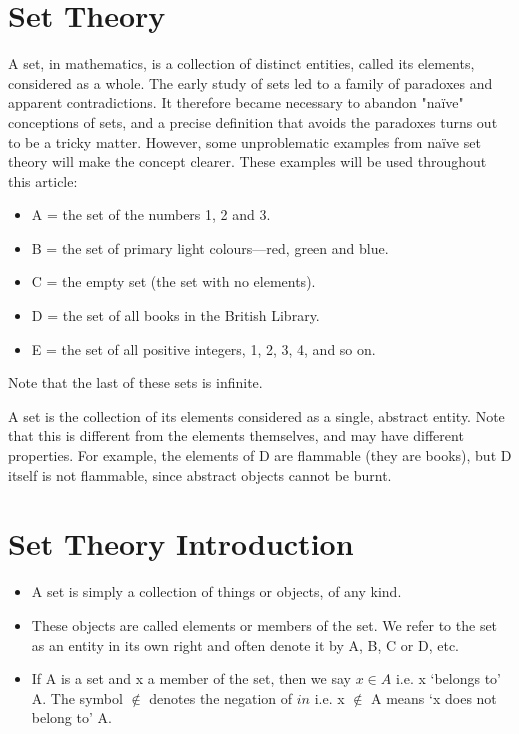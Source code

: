 \documentclass[11pt,a4paper,titlepage,oneside,openany]{article}
\numberwithin{equation}{section}
\numberwithin{algorithm}{section}
\numberwithin{figure}{section}
\numberwithin{table}{section}
\begin{document}
\section{Set Theory}
A set, in mathematics, is a collection of distinct entities, called its elements, considered as a whole. The early study of sets led to a family of paradoxes and apparent contradictions. It therefore became necessary to abandon "naïve" conceptions of sets, and a precise definition that avoids the paradoxes turns out to be a tricky matter. However, some unproblematic examples from naïve set theory will make the concept clearer. These examples will be used throughout this article:

\begin{itemize}
\item A = the set of the numbers 1, 2 and 3.
\item B = the set of primary light colours—red, green and blue.
\item C = the empty set (the set with no elements).
\item D = the set of all books in the British Library.
\item E = the set of all positive integers, 1, 2, 3, 4, and so on.
\end{itemize}

Note that the last of these sets is infinite.

A set is the collection of its elements considered as a single, abstract entity. Note that this is different from the elements themselves, and may have different properties. For example, the elements of D are flammable (they are books), but D itself is not flammable, since abstract objects cannot be burnt.

\section{Set Theory Introduction}


\begin{itemize}
\item A set is simply a collection of things or objects, of any kind. 
\item These objects
are called elements or members of the set. We refer to the set as an
entity in its own right and often denote it by A, B, C or D, etc.
\item 
If A is a set and x a member of the set, then we say $x \in A$ i.e. x ‘belongs to’
A. The symbol $\notin$ denotes the negation of $in$  i.e. x $\notin$ A means ‘x does not
belong to’ A.
\end{itemize}
\end{document}
